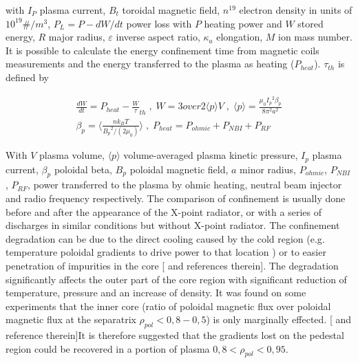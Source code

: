 with $I_P$ plasma current, $B_t$ toroidal magnetic field, $n^{19}$ electron density in units of $10^{19} \#/m^3$, $P_L=P-dW/dt$ power loss with $P$ heating power and $W$ stored energy, $R$ major radius, $\varepsilon$ inverse aspect ratio, $\kappa _a$ elongation, $M$ ion mass number.
It is possible to calculate the energy confinement time from magnetic coils measurements and the energy transferred to the plasma as heating ($P_{heat}$). $\tau_{th}$ is defined by 

\begin{equation}
\begin{split}
\frac {dW} {dt}={P}_{heat} - \frac {W} {\tau }_{ th } \; , \; W={ 3} over{2} \langle p \rangle V \; , \; \langle p \rangle = \frac {{ \mu }_{ 0 } {{ I }_{ p }}^{ 2 } { \beta }_{ p }} { 8 {\pi}^{2} {a}^{2}  } \\ {\beta }_{ p } = \langle \frac { n {k}_{B} T} { {{B}_{p}}^{2} /(2 {\mu}_{0}) } \rangle \; , \; {P }_{ heat }={ P }_{ ohmic }+{ P }_{ NBI }+{ P }_{ RF }
\label{eq:tau}
\end{split}
\end{equation}


With $V$ plasma volume, $\langle p \rangle$ volume-averaged plasma kinetic pressure, $I_p$ plasma current, ${{ \beta }_{ p }}$ poloidal beta, $B_p$ poloidal magnetic field, $a$ minor radius, $P_{ohmic}$, $P_{NBI}$, $P_{RF}$, power transferred to the plasma by ohmic heating, neutral beam injector and radio frequency respectively. \cite{SalarElahi2010} \cite{Fallis2013} The comparison of confinement is usually done before and after the appearance of the X-point radiator, or with a series of discharges in similar conditions but without X-point radiator.
The confinement degradation can be due to the direct cooling caused by the cold region (e.g. temperature poloidal gradients to drive power to that location \cite{Lipschultz1998} ) or to easier penetration of impurities in the core [\cite{Lipschultz2016} and references therein]. The degradation significantly affects the outer part of the core region with significant reduction of temperature, pressure and an increase of density. \cite{Kallenbach2015a}  It was found on some experiments that the inner core (ratio of poloidal magnetic flux over poloidal magnetic flux at the separatrix $ \rho _{pol}<0,8-0,5 $) is only marginally effected. [\cite{Reinke2013} and reference therein]It is therefore suggested that the gradients lost on the pedestal region could be recovered in a portion of plasma $0,8< \rho _{pol}<0,95$. \cite{Reimold2015}

